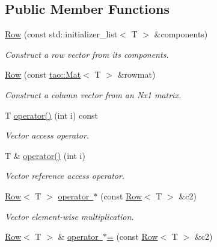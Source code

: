 \subsection*{Public Member Functions}
\begin{DoxyCompactItemize}
\item 
\mbox{\hyperlink{classtao_1_1_row_ab097ce6742696ccf8966b757b9ad9480}{Row}} (const std\+::initializer\+\_\+list$<$ T $>$ \&components)
\begin{DoxyCompactList}\small\item\em Construct a row vector from its components. \end{DoxyCompactList}\item 
\mbox{\label{classtao_1_1_row_a3e537d782c05550fe9d82c023bbc4348}} 
\mbox{\hyperlink{classtao_1_1_row_a3e537d782c05550fe9d82c023bbc4348}{Row}} (const \mbox{\hyperlink{classtao_1_1_mat}{tao\+::\+Mat}}$<$ T $>$ \&rowmat)
\begin{DoxyCompactList}\small\item\em Construct a column vector from an Nx1 matrix. \end{DoxyCompactList}\item 
T \mbox{\hyperlink{classtao_1_1_row_af40ce96ba7f24cfbed041fe15792a476}{operator()}} (int i) const
\begin{DoxyCompactList}\small\item\em Vector access operator. \end{DoxyCompactList}\item 
T \& \mbox{\hyperlink{classtao_1_1_row_a170d8864b87f6fdfa1ecb81f6b698171}{operator()}} (int i)
\begin{DoxyCompactList}\small\item\em Vector reference access operator. \end{DoxyCompactList}\item 
\mbox{\hyperlink{classtao_1_1_row}{Row}}$<$ T $>$ \mbox{\hyperlink{classtao_1_1_row_a7c588c5d90919377b87192709cda6893}{operator $\ast$}} (const \mbox{\hyperlink{classtao_1_1_row}{Row}}$<$ T $>$ \&c2)
\begin{DoxyCompactList}\small\item\em Vector element-\/wise multiplication. \end{DoxyCompactList}\item 
\mbox{\hyperlink{classtao_1_1_row}{Row}}$<$ T $>$ \& \mbox{\hyperlink{classtao_1_1_row_a711c598e31ddec8066cff9e43c3bed0b}{operator $\ast$=}} (const \mbox{\hyperlink{classtao_1_1_row}{Row}}$<$ T $>$ \&c2)

\end{DoxyCompactItemize}
